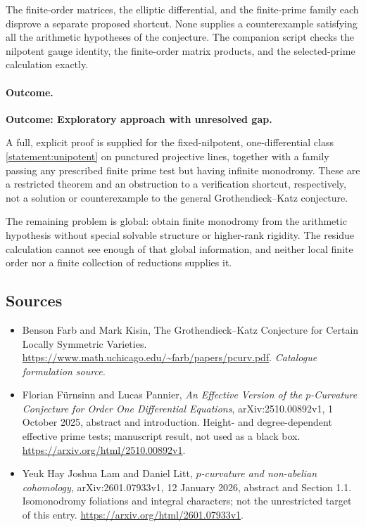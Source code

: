 \documentclass[11pt,a4paper]{article}
\numberwithin{equation}{section}
\begin{document}
The finite-order matrices, the elliptic differential, and the finite-prime
family each disprove a separate proposed shortcut. None supplies a
counterexample satisfying all the arithmetic hypotheses of the conjecture.
The companion script checks the nilpotent gauge identity, the finite-order
matrix products, and the selected-prime calculation exactly.

\paragraph{Outcome.}
\textbf{Outcome: Exploratory approach with unresolved gap.}

A full, explicit proof is supplied for the fixed-nilpotent, one-differential
class \eqref{statement:unipotent} on punctured projective lines, together with a
family passing any prescribed finite prime test but having infinite
monodromy. These are a restricted theorem and an obstruction to a verification
shortcut, respectively, not a solution or counterexample to the general
Grothendieck--Katz conjecture.

The remaining problem is global: obtain finite monodromy from the arithmetic
hypothesis without special solvable structure or higher-rank rigidity.
The residue calculation cannot see enough of that global information, and
neither local finite order nor a finite collection of reductions supplies it.
\subsection{Sources}
\begin{itemize}\raggedright
\item[\textnormal{[S1]}]\hypertarget{source:statement:1}{} Benson Farb and Mark Kisin, The Grothendieck–Katz Conjecture for Certain Locally Symmetric Varieties.
\url{https://www.math.uchicago.edu/~farb/papers/pcurv.pdf}.
{\small\textit{Catalogue formulation source.}}
\item[\textnormal{[E1]}]\hypertarget{extra:statement:1}{} Florian F\"urnsinn and Lucas Pannier, \emph{An Effective Version of the $p$-Curvature Conjecture for Order One Differential Equations}, arXiv:2510.00892v1, 1 October 2025, abstract and introduction. Height- and degree-dependent effective prime tests; manuscript result, not used as a black box.
\url{https://arxiv.org/html/2510.00892v1}.
\item[\textnormal{[E2]}]\hypertarget{extra:statement:2}{} Yeuk Hay Joshua Lam and Daniel Litt, \emph{$p$-curvature and non-abelian cohomology}, arXiv:2601.07933v1, 12 January 2026, abstract and Section 1.1. Isomonodromy foliations and integral characters; not the unrestricted target of this entry.
\url{https://arxiv.org/html/2601.07933v1}.
\end{itemize}
\end{document}

